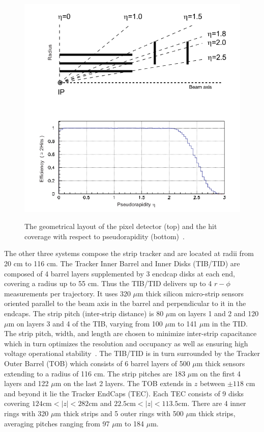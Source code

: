 \begin{figure}[!Hh]
       \centering
       \includegraphics[scale=0.6]{Figures/PixelCoverage.png} \\
       \caption[The layout of the pixel detector.]{The geometrical layout of the pixel detector (top) and the hit coverage with respect to pseudorapidity (bottom)~\cite{CMSdetector}.}
\label{figapp:PixelCoverage}
\end{figure}


The other three systems compose the strip tracker and are located at radii from 20 cm to 116 cm.  The Tracker Inner Barrel and Inner Disks (TIB/TID) are composed of 4 barrel layers supplemented by 3 encdcap disks at each end, covering a radius up to 55 cm.  Thus the TIB/TID delivers up to 4 $r-\phi$ measurements per trajectory.  It uses 320 $\mu\text{m}$ thick silicon micro-strip sensors oriented parallel to the beam axis in the barrel and perpendicular to it in the endcaps.  The strip pitch (inter-strip distance) is 80 $\mu\text{m}$  on layers 1 and 2 and 120 $\mu\text{m}$ on layers 3 and 4 of the TIB, varying from 100 $\mu\text{m}$ to 141 $\mu\text{m}$  in the TID.  The strip pitch, width, and length are chosen to minimize inter-strip capacitance which in turn optimizes the resolution and occupancy as well as ensuring high voltage operational stability~\cite{STRIPtracker}.  The TIB/TID is in turn surrounded by the Tracker Outer Barrel (TOB) which consists of 6 barrel layers of 500 $\mu\text{m}$ thick sensors extending to a radius of 116 cm.  The strip pitches are 183 $\mu\text{m}$ on the first 4 layers and 122 $\mu\text{m}$ on the last 2 layers.  The TOB extends in $z$ between $\pm118$ cm and beyond it lie the Tracker EndCaps (TEC).  Each TEC consists of 9 disks covering $124\text{cm} < |z| < 282 \text{cm}$ and $22.5\text{cm} < |z| < 113.5\text{cm}$.  There are 4 inner rings with 320 $\mu\text{m}$ thick strips and 5 outer rings with 500 $\mu\text{m}$ thick strips, averaging pitches ranging from 97 $\mu\text{m}$ to 184 $\mu\text{m}$.  

